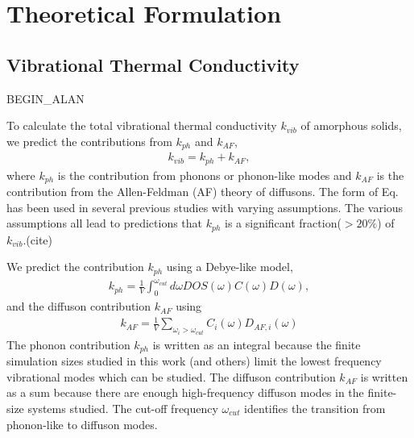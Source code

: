 \documentclass[aps,prb,twocolumn,superscriptaddress,footinbib,amsmath,amssymb,floatfix]{revtex4}
\begin{document}
\section{\label{S:Theory}Theoretical Formulation}

\subsection{\label{S:Theory:Thermal}Vibrational Thermal Conductivity}

BEGIN_ALAN

To calculate the total vibrational thermal conductivity $k_{vib}$ 
of amorphous solids, we predict 
the contributions from $k_{ph}$ and $k_{AF}$, 
\begin{equation}\label{EQ:kvib}
\begin{split}
k_{vib} = k_{ph} + k_{AF},
\end{split}
\end{equation}
where $k_{ph}$\cite{ashcroft_solid_1976,dove_introduction_1993,
ziman_electrons_2001} is the contribution from phonons or 
phonon-like modes and $k_{AF}$ is the contribution from the 
Allen-Feldman (AF) theory of diffusons.
\cite{feldman_thermal_1993} The form of Eq. has been used in 
several previous studies with varying assumptions. The various 
assumptions all lead to predictions that $k_{ph}$ is a significant 
fraction($> 20\%$) of $k_{vib}$.(cite)  

We predict 
the contribution $k_{ph}$ using a Debye-like model,
\begin{equation}\label{EQ:kph}
\begin{split}
k_{ph} = \frac{1}{V}\int_{0}^{\omega_{cut}} 
d\omega DOS(\omega) C(\omega) D(\omega),
\end{split}
\end{equation}
and the diffuson contribution $k_{AF}$ using
\cite{feldman_thermal_1993,feldman_numerical_1999}
\begin{equation}\label{EQ:kAF}
\begin{split}
k_{AF} = \frac{1}{V}\sum_{\omega_i>\omega_{cut}} C_i(\omega) D_{AF,i}(\omega) 
\end{split}
\end{equation}
The phonon contribution $k_{ph}$ is written as an integral because 
the finite simulation sizes studied in this work (and others)
\cite{feldman_thermal_1993,feldman_numerical_1999}
limit the lowest 
frequency vibrational modes which can be studied. The diffuson contribution 
$k_{AF}$ is written as a sum because there are enough high-frequency 
diffuson modes in the finite-size systems studied.
\cite{feldman_thermal_1993,feldman_numerical_1999}  
The cut-off frequency $\omega_{cut}$ identifies the transition from 
phonon-like to diffuson modes.
\cite{feldman_thermal_1993,cahill_thermal_1994,
feldman_numerical_1999,liu_high_2009,yang_anomalously_2010}
\end{document}
